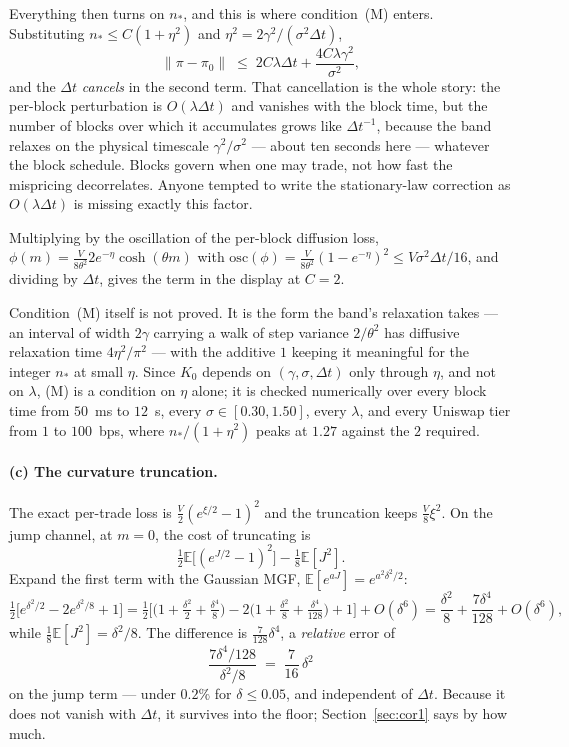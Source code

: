 \documentclass[11pt]{article}
\theoremstyle{definition}
\theoremstyle{remark}
\newcommand{\E}{\mathbb{E}}
\newcommand{\dt}{\Delta t}
\newcommand{\1}{\mathbf{1}}
\begin{document}
Everything then turns on $n_*$, and this is where condition~(M) enters. Substituting $n_*\le C(1+\eta^2)$ and $\eta^2 = 2\gamma^2/(\sigma^2\dt)$,
\[
\|\pi-\pi_0\| \;\le\; 2C\lambda\dt + \frac{4C\lambda\gamma^2}{\sigma^2},
\]
and the $\dt$ \emph{cancels} in the second term. That cancellation is the whole story: the per-block perturbation is $O(\lambda\dt)$ and vanishes with the block time, but the number of blocks over which it accumulates grows like $\dt^{-1}$, because the band relaxes on the physical timescale $\gamma^2/\sigma^2$ --- about ten seconds here --- whatever the block schedule. Blocks govern when one may trade, not how fast the mispricing decorrelates. Anyone tempted to write the stationary-law correction as $O(\lambda\dt)$ is missing exactly this factor.

Multiplying by the oscillation of the per-block diffusion loss, $\phi(m) = \tfrac{V}{8\theta^2}2e^{-\eta}\cosh(\theta m)$ with $\mathrm{osc}(\phi) = \tfrac{V}{8\theta^2}(1-e^{-\eta})^2 \le V\sigma^2\dt/16$, and dividing by $\dt$, gives the term in the display at $C=2$.

Condition~(M) itself is not proved. It is the form the band's relaxation takes --- an interval of width $2\gamma$ carrying a walk of step variance $2/\theta^2$ has diffusive relaxation time $4\eta^2/\pi^2$ --- with the additive $1$ keeping it meaningful for the integer $n_*$ at small $\eta$. Since $K_0$ depends on $(\gamma,\sigma,\dt)$ only through $\eta$, and not on $\lambda$, (M) is a condition on $\eta$ alone; it is checked numerically over every block time from $50$~ms to $12$~s, every $\sigma\in[0.30,1.50]$, every $\lambda$, and every Uniswap tier from $1$ to $100$~bps, where $n_*/(1+\eta^2)$ peaks at $1.27$ against the $2$ required.

\paragraph{(c) The curvature truncation.}
The exact per-trade loss is $\tfrac{V}{2}(e^{\xi/2}-1)^2$ and the truncation keeps $\tfrac{V}{8}\xi^2$. On the jump channel, at $m = 0$, the cost of truncating is
\[
\tfrac12\E\big[(e^{J/2}-1)^2\big] - \tfrac18\E[J^2].
\]
Expand the first term with the Gaussian MGF, $\E[e^{aJ}] = e^{a^2\delta^2/2}$:
\[
\tfrac12\big[e^{\delta^2/2} - 2e^{\delta^2/8} + 1\big]
= \tfrac12\Big[\big(1+\tfrac{\delta^2}{2}+\tfrac{\delta^4}{8}\big) - 2\big(1+\tfrac{\delta^2}{8}+\tfrac{\delta^4}{128}\big) + 1\Big] + O(\delta^6)
= \frac{\delta^2}{8} + \frac{7\delta^4}{128} + O(\delta^6),
\]
while $\tfrac18\E[J^2] = \delta^2/8$. The difference is $\tfrac{7}{128}\delta^4$, a \emph{relative} error of
\[
\frac{7\delta^4/128}{\delta^2/8} \;=\; \frac{7}{16}\,\delta^2
\]
on the jump term --- under $0.2\%$ for $\delta \le 0.05$, and independent of $\dt$. Because it does not vanish with $\dt$, it survives into the floor; Section~\ref{sec:cor1} says by how much.
\end{document}
